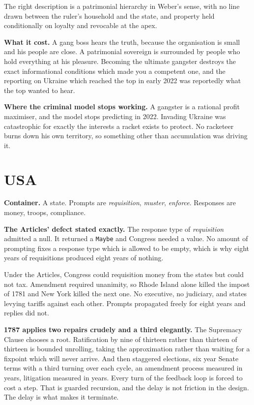 \documentclass[11pt,a4paper]{article}
\begin{document}
The right description is a patrimonial hierarchy in Weber's sense, with no line
drawn between the ruler's household and the state, and property held conditionally
on loyalty and revocable at the apex.

\textbf{What it cost.} A gang boss hears the truth, because the organisation is
small and his people are close. A patrimonial sovereign is surrounded by people who
hold everything at his pleasure. Becoming the ultimate gangster destroys the exact
informational conditions which made you a competent one, and the reporting on
Ukraine which reached the top in early 2022 was reportedly what the top wanted to
hear.

\textbf{Where the criminal model stops working.} A gangster is a rational profit
maximiser, and the model stops predicting in 2022. Invading Ukraine was
catastrophic for exactly the interests a racket exists to protect. No racketeer
burns down his own territory, so something other than accumulation was driving it.

\section{USA}

\begin{sectionbox}
\textbf{Container.} A state. Prompts are \emph{requisition}, \emph{muster},
\emph{enforce}. Responses are money, troops, compliance.

\textbf{The Articles' defect stated exactly.} The response type of
\emph{requisition} admitted a null. It returned a \texttt{Maybe} and Congress
needed a value. No amount of prompting fixes a response type which is allowed to be
empty, which is why eight years of requisitions produced eight years of nothing.
\end{sectionbox}

Under the Articles, Congress could requisition money from the states but could not
tax. Amendment required unanimity, so Rhode Island alone killed the impost of 1781
and New York killed the next one. No executive, no judiciary, and states levying
tariffs against each other. Prompts propagated freely for eight years and replies
did not.

\textbf{1787 applies two repairs crudely and a third elegantly.} The Supremacy
Clause chooses a root. Ratification by nine of thirteen rather than thirteen of
thirteen is bounded unrolling, taking the approximation rather than waiting for a
fixpoint which will never arrive. And then staggered elections, six year Senate
terms with a third turning over each cycle, an amendment process measured in years,
litigation measured in years. Every turn of the feedback loop is forced to cost a
step. That is guarded recursion, and the delay is not friction in the design. The
delay is what makes it terminate.
\end{document}
